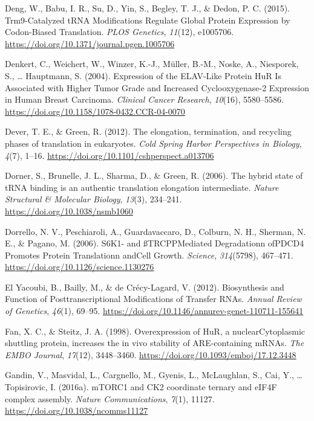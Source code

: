 \documentclass[12pt,openany]{book}
\begin{document}
\hypertarget{ref-Deng2015}{}
Deng, W., Babu, I. R., Su, D., Yin, S., Begley, T. J., \& Dedon, P. C.
(2015). Trm9-Catalyzed tRNA Modifications Regulate Global Protein
Expression by Codon-Biased Translation. \emph{PLOS Genetics},
\emph{11}(12), e1005706.
\url{https://doi.org/10.1371/journal.pgen.1005706}

\hypertarget{ref-Denkert2004}{}
Denkert, C., Weichert, W., Winzer, K.-J., Müller, B.-M., Noske, A.,
Niesporek, S., \ldots{} Hauptmann, S. (2004). Expression of the
ELAV-Like Protein HuR Is Associated with Higher Tumor Grade and
Increased Cyclooxygenase-2 Expression in Human Breast Carcinoma.
\emph{Clinical Cancer Research}, \emph{10}(16), 5580--5586.
\url{https://doi.org/10.1158/1078-0432.CCR-04-0070}

\hypertarget{ref-Dever2012}{}
Dever, T. E., \& Green, R. (2012). The elongation, termination, and
recycling phases of translation in eukaryotes. \emph{Cold Spring Harbor
Perspectives in Biology}, \emph{4}(7), 1--16.
\url{https://doi.org/10.1101/cshperspect.a013706}

\hypertarget{ref-Dorner2006}{}
Dorner, S., Brunelle, J. L., Sharma, D., \& Green, R. (2006). The hybrid
state of tRNA binding is an authentic translation elongation
intermediate. \emph{Nature Structural \& Molecular Biology},
\emph{13}(3), 234--241. \url{https://doi.org/10.1038/nsmb1060}

\hypertarget{ref-Dorrello2006}{}
Dorrello, N. V., Peschiaroli, A., Guardavaccaro, D., Colburn, N. H.,
Sherman, N. E., \& Pagano, M. (2006). S6K1- and ßTRCPPMediated
Degradationn ofPDCD4 Promotes Protein Translationn andCell Growth.
\emph{Science}, \emph{314}(5798), 467--471.
\url{https://doi.org/10.1126/science.1130276}

\hypertarget{ref-ElYacoubi2012}{}
El Yacoubi, B., Bailly, M., \& de Crécy-Lagard, V. (2012). Biosynthesis
and Function of Posttranscriptional Modifications of Transfer RNAs.
\emph{Annual Review of Genetics}, \emph{46}(1), 69--95.
\url{https://doi.org/10.1146/annurev-genet-110711-155641}

\hypertarget{ref-Fan1998}{}
Fan, X. C., \& Steitz, J. A. (1998). Overexpression of HuR, a
nuclearCytoplasmic shuttling protein, increases the in vivo stability of
ARE-containing mRNAs. \emph{The EMBO Journal}, \emph{17}(12),
3448--3460. \url{https://doi.org/10.1093/emboj/17.12.3448}

\hypertarget{ref-Gandin2016}{}
Gandin, V., Masvidal, L., Cargnello, M., Gyenis, L., McLaughlan, S.,
Cai, Y., \ldots{} Topisirovic, I. (2016a). mTORC1 and CK2 coordinate
ternary and eIF4F complex assembly. \emph{Nature Communications},
\emph{7}(1), 11127. \url{https://doi.org/10.1038/ncomms11127}
\end{document}
